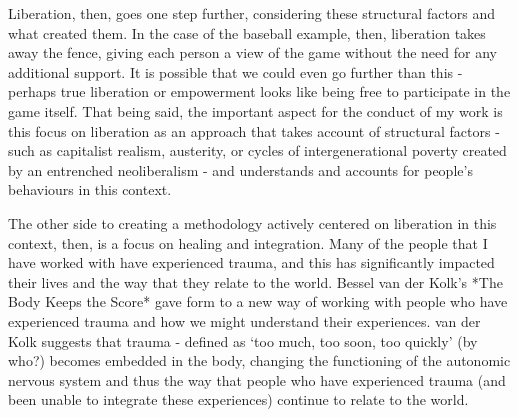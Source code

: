 Liberation, then, goes one step further, considering these structural factors and what created them. In the case of the baseball example, then, liberation takes away the fence, giving each person a view of the game without the need for any additional support. It is possible that we could even go further than this - perhaps true liberation or empowerment looks like being free to participate in the game itself. That being said, the important aspect for the conduct of my work is this focus on liberation as an approach that takes account of structural factors - such as capitalist realism, austerity, or cycles of intergenerational poverty created by an entrenched neoliberalism - and understands and accounts for people’s behaviours in this context. 

The other side to creating a methodology actively centered on liberation in this context, then, is a focus on healing and integration. Many of the people that I have worked with have experienced trauma, and this has significantly impacted their lives and the way that they relate to the world. Bessel van der Kolk’s *The Body Keeps the Score* gave form to a new way of working with people who have experienced trauma and how we might understand their experiences. van der Kolk suggests that trauma - defined as ‘too much, too soon, too quickly’ (by who?) becomes embedded in the body, changing the functioning of the autonomic nervous system and thus the way that people who have experienced trauma (and been unable to integrate these experiences) continue to relate to the world. 































